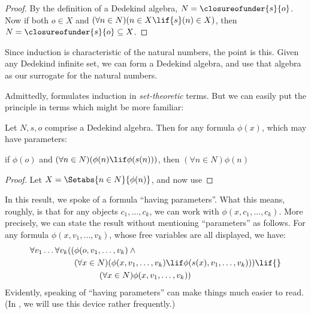 \begin{proof}
By the definition of a Dedekind algebra, $N = \closureofunder{s}{o}$.
Now if both ${o} \in X$ and $(\forall {n} \in N)(n \in X \lif
{s}({n}) \in X)$, then $N = \closureofunder{s}{o} \subseteq X$.
\end{proof}

Since induction is characteristic of the natural numbers, the point is
this. Given any Dedekind infinite set, we can form a Dedekind algebra,
and use that algebra as our surrogate for the natural numbers. 

Admittedly,  formulates induction in
\emph{set-theoretic} terms. But we can easily put the principle in
terms which might be more familiar:

\begin{cor}
Let $N, s, o$ comprise a Dedekind algebra. Then for any formula
$\phi(x)$, which may have parameters:
\begin{center}
	if $\phi(o)$ and $(\forall {n} \in N)(\phi(n)\lif
	\phi({s}({n})))$, {then} $(\forall n \in N)\phi(n)$
\end{center}
\end{cor}

\begin{proof}
Let $X = \Setabs{n \in N}{\phi(n)}$, and now use
\end{proof}

In this result, we spoke of a formula ``having parameters''. What this
means, roughly, is that for any objects $c_1, \ldots, c_k$, we can
work with $\phi(x, c_1, \ldots, c_k)$. More precisely, we can state
the result without mentioning ``parameters'' as follows. For any
formula $\phi(x, v_1, \ldots, v_k)$, whose free variables are all
displayed, we have:
	\begin{align*}
			\forall v_1 \ldots \forall v_k((&\phi(o, v_1,\ldots, v_k) \land {}\\
			&	(\forall x \in N)(\phi(x,v_1, \ldots, v_k) \lif \phi(s(x), v_1,\ldots, v_k))) \lif {}\\
			&\hspace{3em} (\forall x \in N)\phi(x, v_1,\ldots, v_k))
	\end{align*}
Evidently, speaking of ``having parameters'' can make things much
easier to read. (In , we will use this device
rather frequently.)

